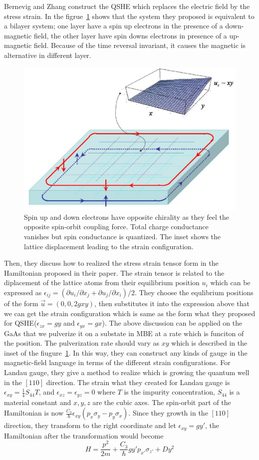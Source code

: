 \documentclass[12pt,a4paper]{article}
\begin{document}
Bernevig and Zhang construct the QSHE which replaces the electric field by
the stress strain. In the figrue~\ref{fig:edgecurrent} shows that the
system they proposed is equivalent to a bilayer system; one layer have a
spin up electrons in the presence of a down-magnetic field, the other layer
have spin downs electrons in presence of a up-magnetic field. Because of 
the time reversal invariant, it causes the magnetic is alternative in
different layer.\\ 
\begin{figure}[htpb]
  \centering
  \includegraphics[width=0.6\linewidth]{edgecurrent.eps}
  \caption{Spin up and down electrons have opposite chirality as
they feel the opposite spin-orbit coupling force. Total charge
conductance vanishes but spin conductance is quantized. The inset
shows the lattice displacement leading to the strain
configuration.}
 \label{fig:edgecurrent}
\end{figure}

Then, they discuss how to realized the stress strain tensor form in the
Hamiltonian proposed in their paper. The strain tensor is related to the
diplacement of the lattice atoms from their equilibrium position $u_i$
which can be expressed as $\epsilon_{ij} = (\partial u_i /\partial x_j + 
\partial u_j /\partial x_i)/2$. They choose the equlibrium positions of the
form $\vec{u} = (0,0, 2 g x y)$, then substitutes it into the expression
above that we can get the strain configuration which is same as the form
what they proposed for QSHE($\epsilon_{zx} = g y$ and $\epsilon_{yx} = g
x$). The above discussion can be applied on the GaAs that we pulverize it
on a substate in MBE at a rate which is funciton of the position. The
pulverization rate should vary as $xy$ which is described in the inset of
the fiugure~\ref{fig:edgecurrent}. In this way, they can construct any
kinds of gauge in the magnetic-field language in terms of the different
strain configurations. For Landau gauge, they give a method to realize
which is growing the quantum well in the $[110]$ direction. The strain what
they created for Landau gauge is $\epsilon_{xy} = \frac{1}{4} S_{44} T $,
and $\epsilon_{xz} = \epsilon_{yz} =0$ where $T$ is the impurity
concentration, $S_{44}$ is a material constant and $x,y,z$ are the cubic 
axes. The spin-orbit part of the Hamiltonian is now $\frac{C_3}{\hbar} 
\epsilon_{xy} (p_x \sigma_y - p_y \sigma_x)$. Since they growth in the
$[110]$ direction, they transform to the right coordinate and let
$\epsilon_{xy} = gy' $, the Hamiltonian after the transformation would
become
\begin{equation*}
H = \frac{p^2}{2m} + \frac{C_3}{\hbar} g y' p_{x'} \sigma_{z'} + Dy^2
\end{equation*}
\end{document}
